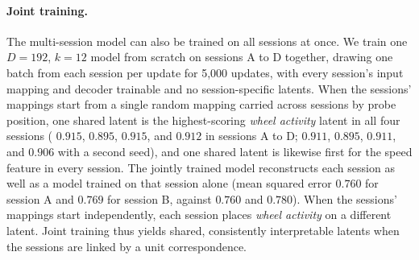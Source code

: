 \begin{table}[!htbp]
    \centering
    {\footnotesize\setlength{\tabcolsep}{1.5pt}\renewcommand{\arraystretch}{1.1}
    }
    \caption{\textbf{Initialisation controls and further sessions.} ``Position'' is the probe-position initialisation followed by training, ``Position only'' the same initialisation with no training, ``Random'' a random initialisation, and ``Scrambled'' the position initialisation after permuting unit positions. Feature columns give the  in the new session of the session A latent for that feature, with its rank among all shared latents in parentheses. ``Top-1 / top-3'' is the percentage of behavior conditions (50 to 59, depending on session and model) whose best-separating session A latent is the best, or among the three best, shared latents for the same condition in the new session. Session C is the day after session A and session D the day after that. All rows except ``Position only'' train the new session's input mapping, decoder, and session-specific latents for 5,000 updates on neural activity alone.}
    \label{table:rebuttal_multisession_controls}
\end{table}

\paragraph{Joint training.}
The multi-session model can also be trained on all sessions at once. We train one $D=192$, $k=12$ model from scratch on sessions A to D together, drawing one batch from each session per update for 5,000 updates, with every session's input mapping and decoder trainable and no session-specific latents. When the sessions' mappings start from a single random mapping carried across sessions by probe position, one shared latent is the highest-scoring \textit{wheel activity} latent in all four sessions ( $0.915$, $0.895$, $0.915$, and $0.912$ in sessions A to D; $0.911$, $0.895$, $0.911$, and $0.906$ with a second seed), and one shared latent is likewise first for the speed feature in every session. The jointly trained model reconstructs each session as well as a model trained on that session alone (mean squared error $0.760$ for session A and $0.769$ for session B, against $0.760$ and $0.780$). When the sessions' mappings start independently, each session places \textit{wheel activity} on a different latent. Joint training thus yields shared, consistently interpretable latents when the sessions are linked by a unit correspondence.


